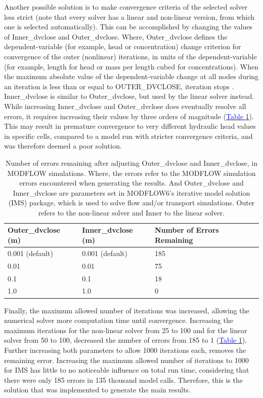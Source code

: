 Another possible solution is to make convergence criteria of the selected solver less strict (note that every solver has a linear and non-linear version, from which one is selected automatically). This can be accomplished by changing the values of Inner\_dvclose and Outer\_dvclose. Where, Outer\_dvclose defines the dependent-variable (for example, head or concentration) change criterion for convergence of the outer (nonlinear) iterations, in units of the dependent-variable (for example, length for head or mass per length cubed for concentrations). When the maximum absolute value of the dependent-variable change at all nodes during an iteration is less than or equal to OUTER\_DVCLOSE, iteration stops \citep{waterloo2024solver}. Inner\_dvclose is similar to Outer\_dvclose, but used by the linear solver instead. While increasing Inner\_dvclose and Outer\_dvclose does eventually resolve all errors, it requires increasing their values by three orders of magnitude (\hyperref[tab_dvclose_errors]{\textcolor{blue}{Table }\ref{tab_dvclose_errors}}). This may result in premature convergence to very different hydraulic head values in specific cells, compared to a model run with stricter convergence criteria, and was therefore deemed a poor solution. 

\begin{table}[ht]
\centering
\caption{Number of errors remaining after adjusting Outer\_dvclose and Inner\_dvclose, in MODFLOW simulations. Where, the errors refer to the MODFLOW simulation errors encountered when generating the results. And Outer\_dvclose and Inner\_dvclose are parameters set in MODFLOW6's iterative model solution (IMS) package, which is used to solve flow and/or transport simulations. Outer refers to the non-linear solver and Inner to the linear solver.}
\label{tab_dvclose_errors}
\begin{tabularx}{\linewidth}{XXX}
\toprule
Outer\_dvclose (m) & Inner\_dvclose (m) & Number of Errors Remaining \\
\midrule
0.001 (default) & 0.001 (default) & 185 \\
0.01  & 0.01 & 75  \\
0.1   & 0.1  & 18  \\
1.0   & 1.0  & 0   \\
\bottomrule
\end{tabularx}
\centering
\end{table}

Finally, the maximum allowed number of iterations was increased, allowing the numerical solver more computation time until convergence. Increasing the maximum iterations for the non-linear solver from 25 to 100 and for the linear solver from 50 to 100, decreased the number of errors from 185 to 1 (\hyperref[tab_dvclose_errors]{\textcolor{blue}{Table }\ref{tab_dvclose_errors}}). Further increasing both parameters to allow 1000 iterations each, removes the remaining error. Increasing the maximum allowed number of iterations to 1000 for IMS has little to no noticeable influence on total run time, considering that there were only 185 errors in 135 thousand model calls. Therefore, this is the solution that was implemented to generate the main results.


